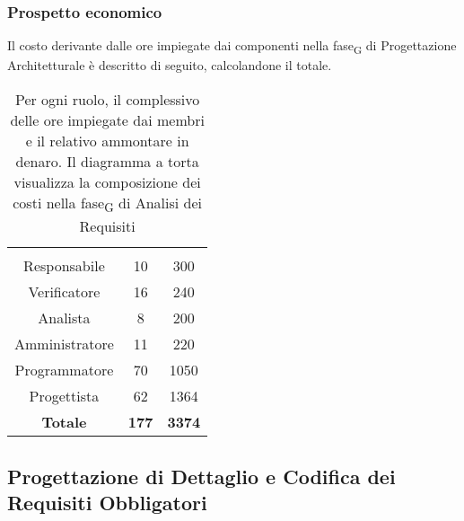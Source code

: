 \subsubsection{Prospetto economico}
Il costo derivante dalle ore impiegate dai componenti nella \gls{fase}\textsubscript{G} di Progettazione Architetturale è descritto di seguito, calcolandone il totale.

\begin{table}[H]
	{\setlength{\parindent}{0cm}
		\begin{minipage}{.43\textwidth}
			\begin{tabular}{ccc}
				\rowcolorhead
				\headertitle{Ruolo} & \headertitle{Ore} & \headertitle{Costo(\euro{})}\\
				Responsabile & 10 & 300\\
				Verificatore & 16 & 240\\
				Analista & 8 & 200\\
				Amministratore & 11 & 220\\
				Programmatore & 70 & 1050\\
				Progettista & 62 & 1364\\
				\hline
				\textbf{Totale} & \textbf{177} & \textbf{3374}\\
			\end{tabular}
		\end{minipage}%
		\begin{minipage}{.57\textwidth}
	\end{minipage} }
	\caption[Prospetto economico della \gls{fase}\textsubscript{G} di Analisi dei Requisiti]{Per ogni ruolo, il complessivo delle ore impiegate dai membri e il relativo ammontare in denaro. Il diagramma a torta visualizza la composizione dei costi nella \gls{fase}\textsubscript{G} di Analisi dei Requisiti}
\end{table}







\subsection{Progettazione di Dettaglio e Codifica dei Requisiti Obbligatori}



